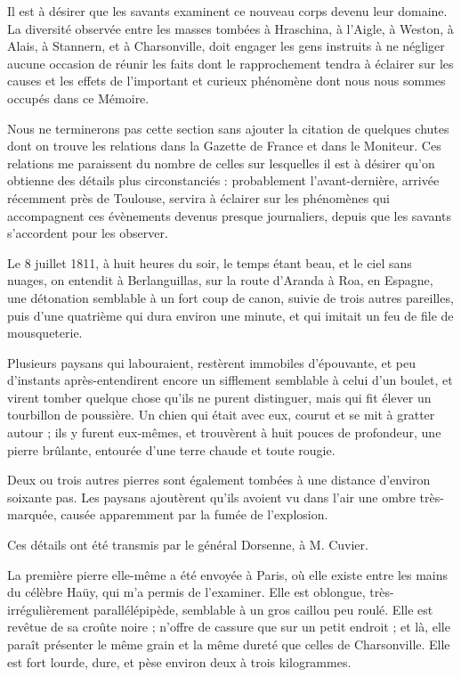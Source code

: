 \documentclass[a4paper, 12pt, oneside, french]{article}
\begin{document}
Il est à désirer que les savants examinent ce nouveau corps devenu leur domaine. La diversité observée entre les masses tombées à Hraschina, à l'Aigle, à Weston, à Alais, à Stannern, et à Charsonville, doit engager les gens instruits à ne négliger aucune occasion de réunir les faits dont le rapprochement tendra à éclairer sur les causes et les effets de l'important et curieux phénomène dont nous nous sommes occupés dans ce Mémoire.

Nous ne terminerons pas cette section sans ajouter la citation de quelques chutes dont on trouve les relations dans la Gazette de France et dans le Moniteur. Ces relations me paraissent du nombre de celles sur lesquelles il est à désirer qu'on obtienne des détails plus circonstanciés : probablement l'avant-dernière, arrivée récemment près de Toulouse, servira à éclairer sur les phénomènes qui accompagnent ces évènements devenus presque journaliers, depuis que les savants s'accordent pour les observer.

Le 8 juillet 1811, à huit heures du soir, le temps étant beau, et le ciel sans nuages, on entendit à Berlanguillas, sur la route d'Aranda à Roa, en Espagne, une détonation semblable à un fort coup de canon, suivie de trois autres pareilles, puis d'une quatrième qui dura environ une minute, et qui imitait un feu de file de mousqueterie.

Plusieurs paysans qui labouraient, restèrent immobiles d'épouvante, et peu d'instants après-entendirent encore un sifflement semblable à celui d'un boulet, et virent tomber quelque chose qu'ils ne purent distinguer, mais qui fit élever un tourbillon de poussière. Un chien qui était avec eux, courut et se mit à gratter autour ; ils y furent eux-mêmes, et trouvèrent à huit pouces de profondeur, une pierre brûlante, entourée d'une terre chaude et toute rougie.

Deux ou trois autres pierres sont également tombées à une distance d'environ soixante pas. Les paysans ajoutèrent qu'ils avoient vu dans l'air une ombre très-marquée, causée apparemment par la fumée de l'explosion.

Ces détails ont été transmis par le général Dorsenne, à M. Cuvier.

La première pierre elle-même a été envoyée à Paris, où elle existe entre les mains du célèbre Haüy, qui m'a permis de l'examiner. Elle est oblongue, très-irrégulièrement parallélépipède, semblable à un gros caillou peu roulé. Elle est revêtue de sa croûte noire ; n'offre de cassure que sur un petit endroit ; et là, elle paraît présenter le même grain et la même dureté que celles de Charsonville. Elle est fort lourde, dure, et pèse environ deux à trois kilogrammes.
\end{document}
